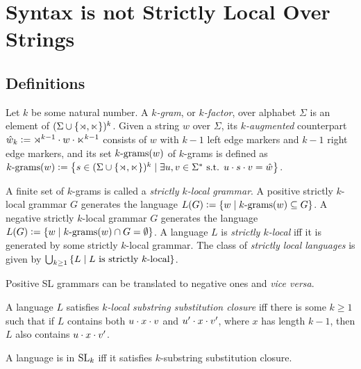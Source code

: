\chapter{Syntax is not Strictly Local Over Strings}
\label{cha:SLsyntax}

\section{Definitions}

\begin{definition}[$k$-grams]
    Let $k$ be some natural number.
    A \emph{$k$-gram}, or \emph{$k$-factor}, over alphabet $\Sigma$ is an element of $(\Sigma \cup \setof{\LeftEdge, \RightEdge})^k$.
    Given a string $w$ over $\Sigma$, its \emph{$k$-augmented} counterpart $\augmented{w}_k \is \LeftEdge^{k-1} \stringcat w \stringcat \RightEdge^{k-1}$ consists of $w$ with $k-1$ left edge markers and $k-1$ right edge markers, and its set $\Bigrams[k](w)$ of $k$-grams is defined as
    \(
        \Bigrams[k](w) \is
            \setof{
                s \in (\Sigma \cup \setof{\LeftEdge, \RightEdge})^k
                \mid
                \exists u,v \in \Sigma^* \text{ s.t. }
                u \stringcat s \stringcat v = \augmented{w}
            }
    \).
\end{definition}

\begin{definition}
    A finite set of $k$-grams is called a \emph{strictly $k$-local grammar}.
    A positive strictly $k$-local grammar $G$ generates the language
    \(
        L(G) \is
            \setof{ w \mid \Bigrams[k](w) \subseteq G }
    \).
    A negative strictly $k$-local grammar $G$ generates the language
    \(
        L(G) \is
            \setof{ w \mid \Bigrams[k](w) \cap G = \emptyset }
    \).
    A language $L$ is \emph{strictly $k$-local} iff it is generated by some strictly $k$-local grammar.
    The class of \emph{strictly local languages} is given by
    \(
        \bigcup_{k \geq 1} \setof{ L \mid L \text{ is strictly $k$-local} }
    \).
\end{definition}

Positive SL grammars can be translated to negative ones and \emph{vice versa}.

\begin{definition}
    A language $L$ satisfies \emph{$k$-local substring substitution closure} iff there is some $k \geq 1$ such that if $L$ contains both $u \stringcat x \stringcat v$ and $u' \stringcat x \stringcat v'$, where $x$ has length $k - 1$, then $L$ also contains $u \stringcat x \stringcat v'$.
\end{definition}
%
\begin{theorem}
    A language is in $\SL_k$ iff it satisfies $k$-substring substitution closure.
\end{theorem}

